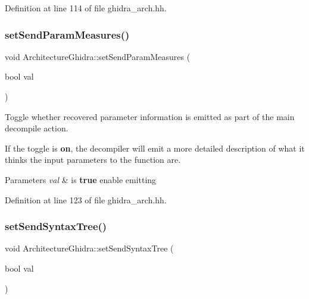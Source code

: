 Definition at line 114 of file ghidra\+\_\+arch.\+hh.

\mbox{\label{class_architecture_ghidra_a1a81c2e3fb902ec976afd5e639a1ba90}} 
\subsubsection{\texorpdfstring{setSendParamMeasures()}{setSendParamMeasures()}}
{\footnotesize\ttfamily void Architecture\+Ghidra\+::set\+Send\+Param\+Measures (\begin{DoxyParamCaption}\item[{bool}]{val }\end{DoxyParamCaption})\hspace{0.3cm}{\ttfamily [inline]}}



Toggle whether recovered parameter information is emitted as part of the main decompile action. 

If the toggle is {\bfseries{on}}, the decompiler will emit a more detailed description of what it thinks the input parameters to the function are. 
\begin{DoxyParams}{Parameters}
{\em val} & is {\bfseries{true}} enable emitting \\
\hline
\end{DoxyParams}


Definition at line 123 of file ghidra\+\_\+arch.\+hh.

\mbox{\label{class_architecture_ghidra_a26c9c47c970ba0b6f1dedaf23f638eb2}} 
\subsubsection{\texorpdfstring{setSendSyntaxTree()}{setSendSyntaxTree()}}
{\footnotesize\ttfamily void Architecture\+Ghidra\+::set\+Send\+Syntax\+Tree (\begin{DoxyParamCaption}\item[{bool}]{val }\end{DoxyParamCaption})\hspace{0.3cm}{\ttfamily [inline]}}



